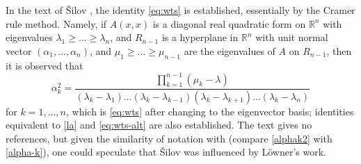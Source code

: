 \documentclass[12pt]{amsart}
\newcommand\R{\mathbb{R}}
\begin{document}
In the text of \v{S}ilov \cite[Section 10.27]{silov}, the identity \eqref{eq:wts} is established, essentially by the Cramer rule method.  Namely, if $A(x,x)$ is a diagonal real quadratic form on $\R^n$ with eigenvalues $\lambda_1 \geq \dots \geq \lambda_n$, and $R_{n-1}$ is a hyperplane in $\R^n$ with unit normal vector $(\alpha_1,\dots,\alpha_n)$, and $\mu_1 \geq \dots \geq \mu_{n-1}$ are the eigenvalues of $A$ on $R_{n-1}$, then it is observed that 
\begin{equation}\label{alphak2}
\alpha_k^2 = \frac{\prod_{k=1}^{n-1} (\mu_k - \lambda)}{(\lambda_k - \lambda_1) \dots (\lambda_k - \lambda_{k-1}) (\lambda_k - \lambda_{k+1}) \dots (\lambda_k-\lambda_n)}
\end{equation}
for $k=1,\dots,n$, which is \eqref{eq:wts} after changing to the eigenvector basis; identities equivalent to \eqref{la} and \eqref{eq:wts-alt} are also established.  The text \cite{silov} gives no references, but given the similarity of notation with \cite{Lowner} (compare \eqref{alphak2} with \eqref{alpha-k}), one could speculate that \v{S}ilov was influenced by L\"owner's work.
\end{document}
